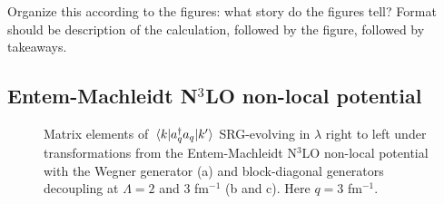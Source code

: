 \documentclass[preprintnumbers,floatfix,aps,prc,preprint,nofootinbib]{revtex4-1}
\begin{document}
Organize this according to the figures: what story do the figures tell? Format should be description of the calculation, followed by the figure, followed by takeaways.


\subsection{Entem-Machleidt N$^3$LO non-local potential}
\label{sec:nonlocal_results}


\begin{figure}[H]
	\centering
	

	\caption{Matrix elements of $\mel{k}{a^{\dagger}_q a_q}{k'}$ SRG-evolving in $\lambda$ right to left under transformations from the Entem-Machleidt N$^3$LO non-local potential with the Wegner generator (a) and block-diagonal generators decoupling at $\Lambda=2$ and $3$ fm$^{-1}$ (b and c). Here $q=3$ fm$^{-1}$.}
	\label{momentum_projection_contours_q3,00_kvnn10}
\end{figure}
\end{document}
